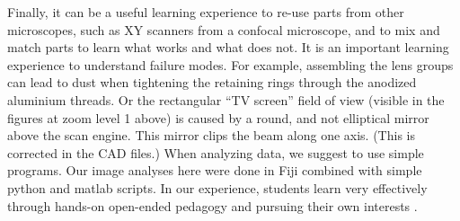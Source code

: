 \documentclass[10pt,letterpaper]{article}
\begin{document}
Finally, it can be a useful learning experience to re-use parts from other microscopes, such as XY scanners from a confocal microscope\cite{Nikolenko2013}, and to mix and match parts to learn what works and what does not. It is an important learning experience to understand failure modes. For example, assembling the lens groups can lead to dust when tightening the retaining rings through the anodized aluminium threads. Or the rectangular ``TV screen'' field of view (visible in the figures at zoom level 1 above) is caused by a round, and not elliptical mirror above the scan engine. This mirror clips the beam along one axis. (This is corrected in the CAD files.) When analyzing data, we suggest to use simple programs. Our image analyses here were done in Fiji \cite{Schindelin2019} combined with simple python and matlab scripts. In our experience, students learn very effectively through hands-on open-ended pedagogy and pursuing their own interests \cite{Zajdel2016}.\newline
\end{document}
